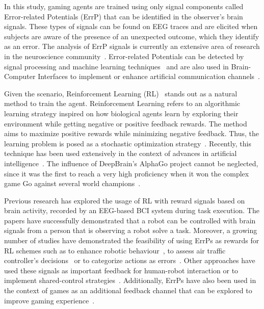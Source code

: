 \documentclass[journal]{IEEEtran}
\begin{document}
In this study, gaming agents are trained using only signal components called Error-related Potentials (ErrP) that can be identified in the observer's brain signals.  These types of signals can be found on EEG traces and are elicited when subjects are aware of the presence of an unexpected outcome, which they identify as an error.  The analysis of ErrP signals is currently an extensive area of research in the neuroscience community~\cite{Holroyd2009}. Error-related Potentials can be detected by signal processing and machine learning techniques~\cite{EERP-PAPER} and are also used in Brain-Computer Interfaces to implement or enhance artificial communication channels~\cite{Chavarriaga2014}.

Given the scenario, Reinforcement Learning (RL)~\cite{Sutton2018} stands out as a natural method to train the agent.  Reinforcement Learning refers to an algorithmic learning strategy inspired on how biological agents learn by exploring their environment while getting negative or positive feedback rewards.  The method aims to maximize positive rewards while minimizing negative feedback.  Thus, the learning problem is posed as a stochastic optimization strategy~\cite{Santos1999}.  Recently, this technique has been used extensively in the context of advances in artificial intelligence~\cite{Nguyen2020}. The influence of DeepBrain's AlphaGo project cannot be neglected, since it was the first to reach a very high proficiency when it won the complex game Go against several world champions~\cite{ALPHA-GO}.


Previous research has explored the usage of RL with reward signals based on brain activity, recorded by an EEG-based BCI system during task execution. The papers \cite{ROBOT-CONTROL-PAPER,Kim2017,Omedes2013} have successfully demonstrated that a robot can be controlled with brain signals from a person that is observing a robot solve a task.  Moreover, a growing number of studies have demonstrated the feasibility of using ErrPs as rewards for RL schemes such as to enhance robotic behaviour~\cite{Luo2019}, to assess air traffic controller's decisions~\cite{Goh2019} or to categorize actions as errors~\cite{Wirth2020}. Other approaches have used these signals as important feedback for human-robot interaction or to implement shared-control strategies~\cite{Schiatti2018}.  Additionally, ErrPs have also been used in the context of games as an additional feedback channel that can be explored to improve gaming experience~\cite{Plass-OudeBos2010,kober2018bci}.
\end{document}
